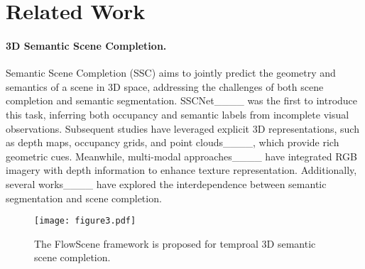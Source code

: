 \section{Related Work}
\paragraph{3D Semantic Scene Completion.}

Semantic Scene Completion (SSC) aims to jointly predict the geometry and semantics of a scene in 3D space, addressing the challenges of both scene completion and semantic segmentation. SSCNet____ was the first to introduce this task, inferring both occupancy and semantic labels from incomplete visual observations. Subsequent studies have leveraged explicit 3D representations, such as depth maps, occupancy grids, and point clouds____, which provide rich geometric cues. Meanwhile, multi-modal approaches____ have integrated RGB imagery with depth information to enhance texture representation. Additionally, several works____ have explored the interdependence between semantic segmentation and scene completion.
\begin{figure*}[t]
\centering
  \texttt{[image: figure3.pdf]}
  \caption{The FlowScene framework is proposed for temproal 3D semantic scene completion.}
  \label{fig:figure3}
\end{figure*}

